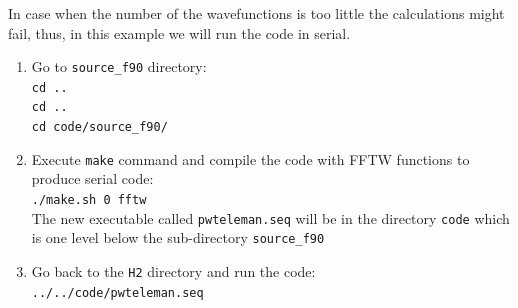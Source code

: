 \documentclass[10pt]{beamer}
\begin{document}
\begin{frame}
\frametitle{ }
In case when the number of the wavefunctions is too little the calculations might fail, thus, in this example we will run the code in serial. \\
\vspace*{0.4cm}
\begin{enumerate} 
\item Go to {\tt source\_f90} directory:\\
\vspace*{0.2cm}
{\tt cd ..}\\
{\tt cd ..}\\
{\tt cd code/source\_f90/}\\
\vspace*{0.2cm}
\item Execute {\tt make} command and compile the code with FFTW functions to produce serial code:\\
\vspace*{0.2cm}
{\tt ./make.sh 0 fftw}\\
\vspace*{0.2cm}
The new executable called {\tt pwteleman.seq} will be in the directory {\tt code} which is one level below the sub-directory {\tt source\_f90}\\
\vspace*{0.4cm}
\item  Go back to the {\tt H2} directory and run the code:\\
\vspace*{0.2cm}
{\tt ../../code/pwteleman.seq}\\
\vspace*{0.2cm}

\end{enumerate} 
 

   
\end{frame}


\end{document}
